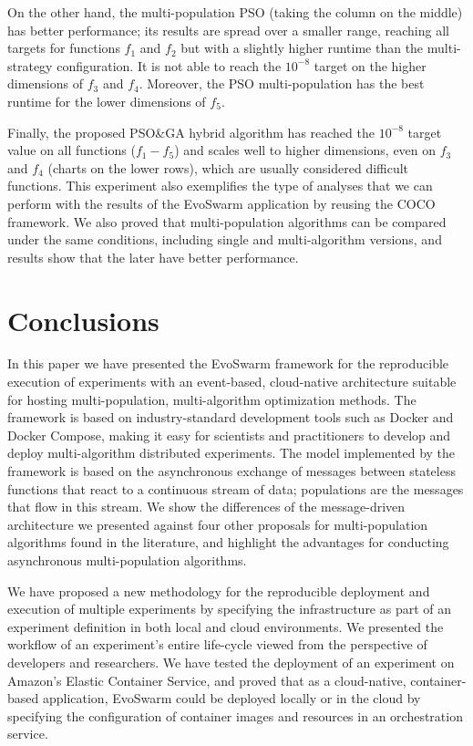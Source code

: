 \documentclass[review]{elsarticle}
\begin{document}
On the other hand, the multi-population PSO (taking the column on the middle) 
has better performance; its results are spread over a smaller range,
reaching all targets for functions $f_1$ and $f_2$ but with a slightly higher
runtime than the multi-strategy configuration. It is not able to reach the
$10^{-8}$ target on the higher dimensions of $f_3$ and $f_4$. Moreover, the PSO
multi-population has the best runtime for the lower dimensions of $f_5$.

Finally, the proposed PSO\&GA hybrid algorithm has reached the $10^{-8}$ target
value on all functions ($f_1-f_5$) and scales well to higher dimensions, even on
$f_3$ and $f_4$ (charts on the lower rows), which are usually considered
difficult functions. This experiment also exemplifies the type of analyses that
we can perform with the results of the EvoSwarm application by reusing the COCO framework.
We also proved that multi-population algorithms can be compared under the same 
conditions, including single and multi-algorithm versions, and results show 
that the later have better performance.


\section{Conclusions} 
\label{conclusions}

In this paper we have presented the EvoSwarm framework for the
reproducible execution of experiments with an event-based,
cloud-native architecture suitable for hosting multi-population,
multi-algorithm optimization methods.  The framework is based on
industry-standard development tools such as Docker and Docker Compose,
making it easy for scientists and practitioners to develop and deploy
multi-algorithm distributed experiments. The model implemented by the
framework is based on the asynchronous exchange of messages between
stateless functions that react to a continuous stream of data;
populations are the messages that flow in this stream. We show the
differences of the message-driven architecture we presented against
four other proposals for multi-population algorithms found in the
literature, and highlight the advantages for conducting asynchronous
multi-population algorithms.

We have proposed a new methodology for the reproducible deployment and execution of
multiple experiments by specifying the infrastructure as part of an experiment
definition in both local and cloud environments. We presented the workflow of an
experiment's entire life-cycle viewed from the perspective of developers and
researchers. 
We have tested the deployment of an experiment on Amazon's Elastic
Container Service, and proved that as a cloud-native, container-based application,
EvoSwarm could be deployed locally or in the cloud by specifying the configuration 
of container images and resources in an orchestration service.
\end{document}
